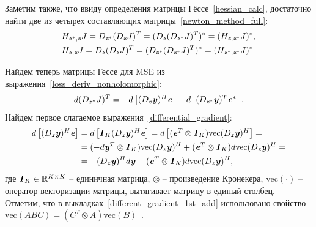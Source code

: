 Заметим также, что ввиду определения матрицы Гёссе~\eqref{hessian_calc}, достаточно найти две из четырех составляющих матрицы~\eqref{newton_method_full}:
\begin{align}
	&H_{\textbf{\textit{z}}^*, \textbf{\textit{z}}}J=D_{\textbf{\textit{z}}^*}(D_{\textbf{\textit{z}}}J)^T=(D_{\textbf{\textit{z}}}(D_{\textbf{\textit{z}}^*}J)^T)^*=(H_{\textbf{\textit{z}}, \textbf{\textit{z}}^*}J)^*, \label{hessian_mixed_conj} \\
	&H_{\textbf{\textit{z}}, \textbf{\textit{z}}}J=D_{\textbf{\textit{z}}}(D_{\textbf{\textit{z}}}J)^T=(D_{\textbf{\textit{z}}^*}(D_{\textbf{\textit{z}}^*}J)^T)^*=(H_{\textbf{\textit{z}}^*, \textbf{\textit{z}}^*}J)^*
	\label{hessian_nonmixed_conj}
\end{align}

Найдем теперь матрицы Гессе для MSE из выражения~\eqref{loss_deriv_nonholomorphic}:
\begin{equation}
	d(D_{\textbf{\textit{z}}^*}J)^T=-d\begin{bmatrix}
		(D_{\textbf{\textit{z}}}\textbf{\textit{y}})^H\textbf{\textit{e}}
	\end{bmatrix}-d\begin{bmatrix}
	(D_{\textbf{\textit{z}}^*}\textbf{\textit{y}})^T\textbf{\textit{e}}^*
	\end{bmatrix}.
	\label{differential_gradient}
\end{equation}
Найдем первое слагаемое выражения~\eqref{differential_gradient}:
\begin{align}
	d\begin{bmatrix}
		(D_{\textbf{\textit{z}}}\textbf{\textit{y}})^H\textbf{\textit{e}}
	\end{bmatrix}&=
	d\begin{bmatrix}
		\textbf{\textit{I}}_{K}(D_{\textbf{\textit{z}}}\textbf{\textit{y}})^H\textbf{\textit{e}}
	\end{bmatrix}=
	d\begin{bmatrix}
		(\textbf{\textit{e}}^T\otimes\textbf{\textit{I}}_{K})\text{vec}(D_{\textbf{\textit{z}}}\textbf{\textit{y}})^H
	\end{bmatrix}= \nonumber \\
	&=(-d\textbf{\textit{y}}^T\otimes\textbf{\textit{I}}_{K})\text{vec}(D_{\textbf{\textit{z}}}\textbf{\textit{y}})^H+(\textbf{\textit{e}}^T\otimes\textbf{\textit{I}}_{K})d\text{vec}(D_{\textbf{\textit{z}}}\textbf{\textit{y}})^H= \nonumber \\
	&=-(D_{\textbf{\textit{z}}}\textbf{\textit{y}})^Hd\textbf{\textit{y}}+(\textbf{\textit{e}}^T\otimes\textbf{\textit{I}}_{K})d\text{vec}(D_{\textbf{\textit{z}}}\textbf{\textit{y}})^H,
	\label{different_gradient_1st_add}
\end{align}
где $\textbf{\textit{I}}_{K}\in\mathbb{R}^{K\times K}$ -- единичная матрица, $\otimes$ -- произведение Кронекера, $\text{vec}(\cdot)$ -- оператор векторизации матрицы, вытягивает матрицу в единый столбец. Отметим, что в выкладках~\eqref{different_gradient_1st_add} использовано свойство $\text{vec}(ABC)=(C^T\otimes A)\text{vec}(B)$~\cite{wirt_deriv_book}.

